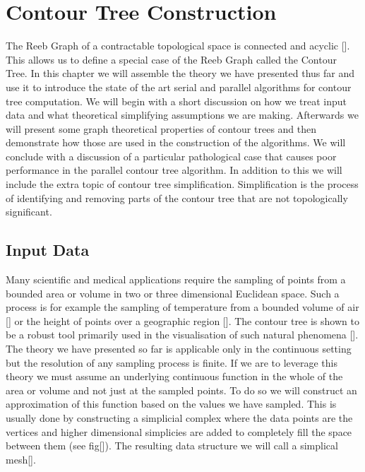 \chapter{Contour Tree Construction}
\label{chapter3}


The Reeb Graph of a contractable topological space is connected and acyclic []. This allows us to define a special case of the Reeb Graph called the Contour Tree.  In this chapter we will assemble the theory we have presented thus far and use it to introduce the state of the art serial and parallel algorithms for contour tree computation. We will begin with a short discussion on how we treat input data and what theoretical simplifying assumptions we are making. Afterwards we will present some graph theoretical properties of contour trees and then demonstrate how those are used in the construction of the algorithms. We will conclude with a discussion of a particular pathological case that causes poor performance in the parallel contour tree algorithm. In addition to this we will include the extra topic of contour tree simplification. Simplification is the process of identifying and removing parts of the contour tree that are not topologically significant.


\section{Input Data}

Many scientific and medical applications require the sampling of points from a bounded area or volume in two or three dimensional Euclidean space. Such a process is for example the sampling of temperature from a bounded volume of air [] or the height of points over a geographic region []. The contour tree is shown to be a robust tool primarily used in the visualisation of such natural phenomena []. The theory we have presented so far is applicable only in the continuous setting but the resolution of any sampling process is finite. If we are to leverage this theory we must assume an underlying continuous function in the whole of the area or volume and not just at the sampled points. To do so we will construct an approximation of this function based on the values we have sampled. This is usually done by constructing a simplicial complex where the data points are the vertices and higher dimensional simplicies are added to completely fill the space between them (see fig[]). The resulting data structure we will call a simplical mesh[]. 

